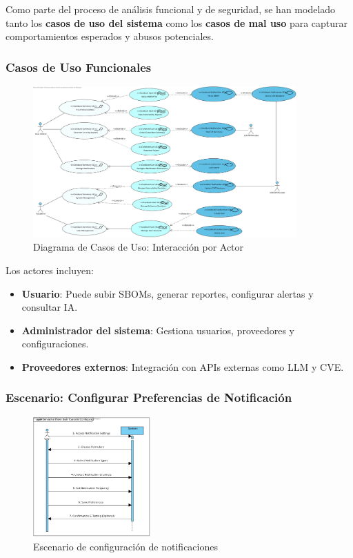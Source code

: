 \documentclass[11pt]{article}
\begin{document}
Como parte del proceso de análisis funcional y de seguridad, se han modelado tanto los \textbf{casos de uso del sistema} como los \textbf{casos de mal uso} para capturar comportamientos esperados y abusos potenciales.

\subsubsection*{Casos de Uso Funcionales}

\begin{figure}[H]
    \centering
    \includegraphics[width=0.9\textwidth]{images/use_cases.png}
    \caption{Diagrama de Casos de Uso: Interacción por Actor}
\end{figure}

Los actores incluyen:

\begin{itemize}
    \item \textbf{Usuario}: Puede subir SBOMs, generar reportes, configurar alertas y consultar IA.
    \item \textbf{Administrador del sistema}: Gestiona usuarios, proveedores y configuraciones.
    \item \textbf{Proveedores externos}: Integración con APIs externas como LLM y CVE.
\end{itemize}

\subsubsection*{Escenario: Configurar Preferencias de Notificación}

\begin{figure}[H]
    \centering
    \includegraphics[width=0.4\textwidth]{images/Configure_Notification_Preferences-Scenario.png}
    \caption{Escenario de configuración de notificaciones}
\end{figure}
\end{document}
